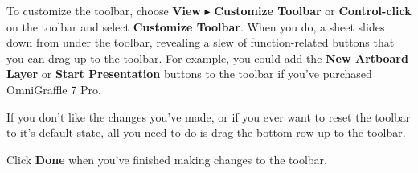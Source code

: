\documentclass[../main.tex]{subfiles}
\begin{document}
To customize the toolbar, choose \textbf{View} $\blacktriangleright$ \textbf{Customize Toolbar}
or \textbf{Control-click} on the toolbar and select \textbf{Customize Toolbar}. When you do, a
sheet slides down from under the toolbar, revealing a slew of function-related buttons that
you can drag up to the toolbar. For example, you could add the \textbf{New Artboard Layer} or
\textbf{Start Presentation} buttons to the toolbar if you've purchased OmniGraffle 7 Pro.


If you don't like the changes you've made, or if you ever want to reset the toolbar to it's
default state, all you need to do is drag the bottom row up to the toolbar.

Click \textbf{Done} when you've finished making changes to the toolbar.
\end{document}
